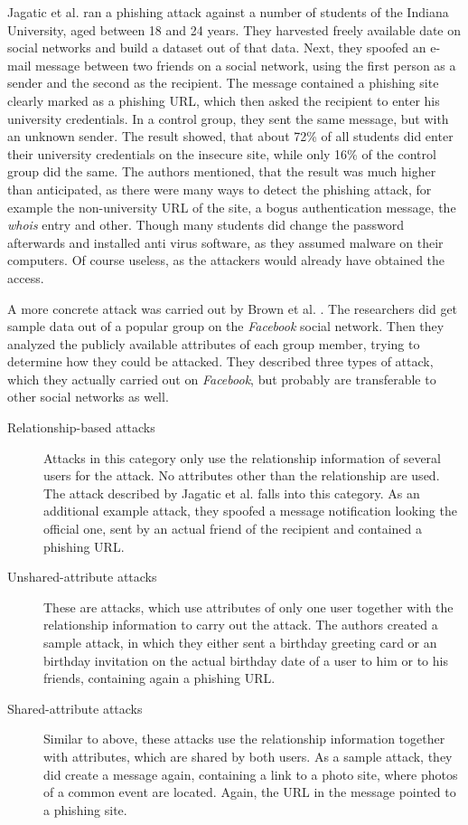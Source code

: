 Jagatic et al. \cite{jagatic2007} ran a phishing attack against a number of
students of the Indiana University, aged between 18 and 24 years. They
harvested freely available date on social networks and build a dataset out of
that data. Next, they spoofed an e-mail message between two friends on a social
network, using the first person as a sender and the second as the recipient.
The message contained a phishing site clearly marked as a phishing URL, which
then asked the recipient to enter his university credentials. In a control
group, they sent the same message, but with an unknown sender. The result
showed, that about 72\% of all students did enter their university credentials
on the insecure site, while only 16\% of the control group did the same. The
authors mentioned, that the result was much higher than anticipated, as there
were many ways to detect the phishing attack, for example the non-university
URL of the site, a bogus authentication message, the \textit{whois} entry and
other. Though many students did change the password afterwards and installed
anti virus software, as they assumed malware on their computers. Of course
useless, as the attackers would already have obtained the access.

A more concrete attack was carried out by Brown et al. \cite{brown2008}. The
researchers did get sample data out of a popular group on the \textit{Facebook}
social network. Then they analyzed the publicly available attributes of each
group member, trying to determine how they could be attacked. They described
three types of attack, which they actually carried out on \textit{Facebook},
but probably are transferable to other social networks as well. 

\begin{description}
\item[Relationship-based attacks]
Attacks in this category only use the relationship information of several
users for the attack. No attributes other than the relationship are used. The
attack described by Jagatic et al. \cite{jagatic2007} falls into this category. As an
additional example attack, they spoofed a message notification looking the
official one, sent by an actual friend of the recipient and contained a
phishing URL.

\item[Unshared-attribute attacks]
These are attacks, which use attributes of only one user together
with the relationship information to carry out the attack. The authors created
a sample attack, in which they either sent a birthday greeting card or an
birthday invitation on the actual birthday date of a user to him or to his
friends, containing again a phishing URL.

\item[Shared-attribute attacks]
Similar to above, these attacks use the relationship information together with
attributes, which are shared by both users. As a sample attack, they did create
a message again, containing a link to a photo site, where photos of a common
event are located. Again, the URL in the message pointed to a phishing site.
\end{description}

